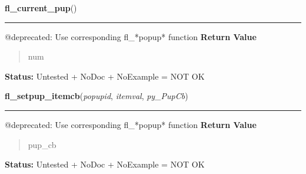 \hspace{.8\funcindent}\begin{boxedminipage}{\funcwidth}

    \raggedright \textbf{fl\_current\_pup}()

    \vspace{-1.5ex}

    \rule{\textwidth}{0.5\fboxrule}
\setlength{\parskip}{2ex}

@deprecated: Use corresponding fl\_*popup* function
\setlength{\parskip}{1ex}
      \textbf{Return Value}
    \vspace{-1ex}

      \begin{quote}

num
      \end{quote}

\textbf{Status:} 
Untested + NoDoc + NoExample = NOT OK


    \end{boxedminipage}

    \label{xformslib:deprecated:fl_setpup_itemcb}

    \vspace{0.5ex}

\hspace{.8\funcindent}\begin{boxedminipage}{\funcwidth}

    \raggedright \textbf{fl\_setpup\_itemcb}(\textit{popupid}, \textit{itemval}, \textit{py\_PupCb})

    \vspace{-1.5ex}

    \rule{\textwidth}{0.5\fboxrule}
\setlength{\parskip}{2ex}

@deprecated: Use corresponding fl\_*popup* function
\setlength{\parskip}{1ex}
      \textbf{Return Value}
    \vspace{-1ex}

      \begin{quote}

pup\_cb
      \end{quote}

\textbf{Status:} 
Untested + NoDoc + NoExample = NOT OK


    \end{boxedminipage}

    \label{xformslib:deprecated:fl_setpup_menucb}

